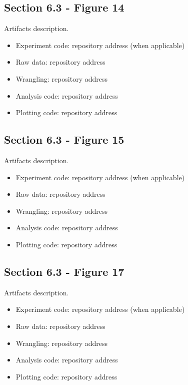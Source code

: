 \subsection{Section 6.3 - Figure 14}
\label{apndx:fig14}

Artifacts description.

\begin{itemize}
    \item Experiment code: repository address (when applicable)
    \item Raw data: repository address
    \item Wrangling: repository address
    \item Analysis code: repository address
    \item Plotting code: repository address
\end{itemize}

\subsection{Section 6.3 - Figure 15}
\label{apndx:fig15}

Artifacts description.

\begin{itemize}
    \item Experiment code: repository address (when applicable)
    \item Raw data: repository address
    \item Wrangling: repository address
    \item Analysis code: repository address
    \item Plotting code: repository address
\end{itemize}

\subsection{Section 6.3 - Figure 17}
\label{apndx:fig16}

Artifacts description.

\begin{itemize}
    \item Experiment code: repository address (when applicable)
    \item Raw data: repository address
    \item Wrangling: repository address
    \item Analysis code: repository address
    \item Plotting code: repository address
\end{itemize}

